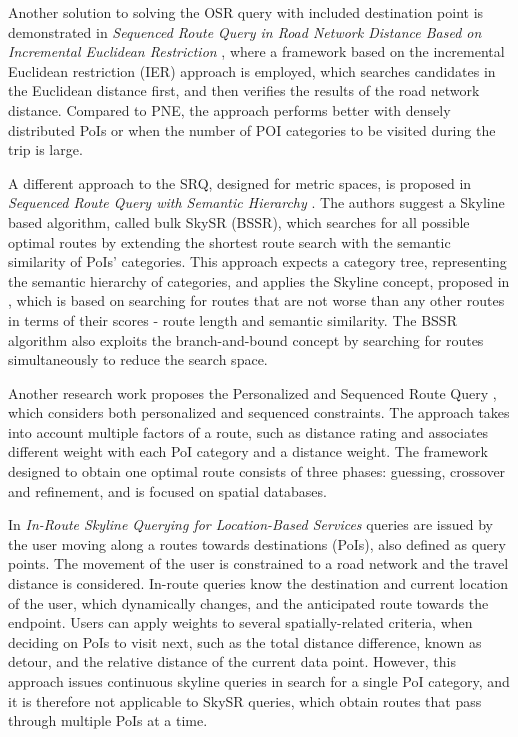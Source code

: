 Another solution to solving the OSR query with included destination point is demonstrated in \textit{Sequenced Route Query in Road Network Distance Based on Incremental Euclidean Restriction} \cite{betterOSR}, where a framework based on the incremental Euclidean restriction (IER) approach is employed, which searches candidates in the Euclidean distance first, and then verifies the results of the road network distance. Compared to PNE, the approach performs better with densely distributed PoIs or when the number of POI categories to be visited during the trip is large.

A different approach to the SRQ, designed for metric spaces, is proposed in \textit{Sequenced Route Query with Semantic Hierarchy} \cite{semanticSRQ}. The authors suggest a Skyline based algorithm, called bulk SkySR (BSSR), which searches for all possible optimal routes by extending the shortest route search with the semantic similarity of PoIs' categories. This approach expects a category tree, representing the semantic hierarchy of categories, and applies the Skyline concept, proposed in \cite{skyOp}, which is based on searching for routes that are not worse than any other routes in terms of their scores - route length and semantic similarity. The BSSR algorithm also exploits the branch-and-bound concept by searching for routes simultaneously to reduce the search space. 

Another research work proposes the Personalized and Sequenced Route Query \cite{personalSRQ}, which considers both personalized and sequenced constraints. The approach takes into account multiple factors of a route, such as distance rating and associates different weight with each PoI category and a distance weight. The framework designed to obtain one optimal route consists of three phases: guessing, crossover and refinement, and is focused on spatial databases. 

In \textit{In-Route Skyline Querying for Location-Based Services} \cite{dynamicSRQ} queries are issued by the user moving along a routes towards destinations (PoIs), also defined as query points. The movement of the user is constrained to a road network and the travel distance is considered. In-route queries know the destination and current location of the user, which dynamically changes, and the anticipated route towards the endpoint. Users can apply weights to several spatially-related criteria, when deciding on PoIs to visit next, such as the total distance difference, known as detour, and the relative distance of the current data point. However, this approach issues continuous skyline queries in search for a single PoI category, and it is therefore not applicable to SkySR queries, which obtain routes that pass through multiple PoIs at a time. 

